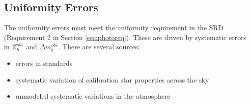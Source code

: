 \documentclass[12pt,preprint]{aastex}
\begin{document}
\subsection{Uniformity Errors}
The uniformity errors must meet the uniformity requirement in the SRD (Requirement 2 in Section \ref{sec:photoreq}).  These are driven by systematic errors in $Z_b^{obs}$ and $\Delta m_b^{obs}$.  There are several sources:
\begin{itemize}
\item{errors in standards}
\item{systematic variation of calibration star properties across the sky}
\item{unmodeled systematic variations in the atmosphere}
\end{itemize}

\begin{figure}[htbp]
\centering
{}
\end{figure}
\end{document}
